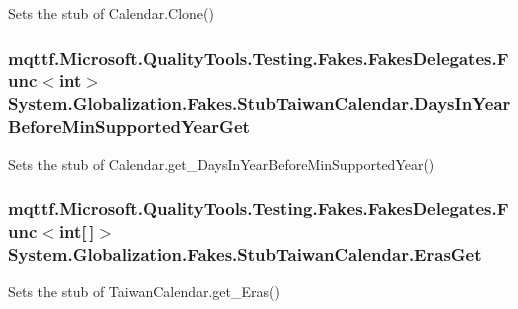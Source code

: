 Sets the stub of Calendar.\-Clone()

\hypertarget{class_system_1_1_globalization_1_1_fakes_1_1_stub_taiwan_calendar_aec82fad403368bc9fa64de1b7bda4d0f}{
\subsubsection[{Days\-In\-Year\-Before\-Min\-Supported\-Year\-Get}]{\setlength{\rightskip}{0pt plus 5cm}mqttf.\-Microsoft.\-Quality\-Tools.\-Testing.\-Fakes.\-Fakes\-Delegates.\-Func$<$int$>$ System.\-Globalization.\-Fakes.\-Stub\-Taiwan\-Calendar.\-Days\-In\-Year\-Before\-Min\-Supported\-Year\-Get}}\label{class_system_1_1_globalization_1_1_fakes_1_1_stub_taiwan_calendar_aec82fad403368bc9fa64de1b7bda4d0f}


Sets the stub of Calendar.\-get\-\_\-\-Days\-In\-Year\-Before\-Min\-Supported\-Year()

\hypertarget{class_system_1_1_globalization_1_1_fakes_1_1_stub_taiwan_calendar_ab8eb00a655bda02c9dbd7f110045f9cd}{
\subsubsection[{Eras\-Get}]{\setlength{\rightskip}{0pt plus 5cm}mqttf.\-Microsoft.\-Quality\-Tools.\-Testing.\-Fakes.\-Fakes\-Delegates.\-Func$<$int\mbox{[}$\,$\mbox{]}$>$ System.\-Globalization.\-Fakes.\-Stub\-Taiwan\-Calendar.\-Eras\-Get}}\label{class_system_1_1_globalization_1_1_fakes_1_1_stub_taiwan_calendar_ab8eb00a655bda02c9dbd7f110045f9cd}


Sets the stub of Taiwan\-Calendar.\-get\-\_\-\-Eras()

